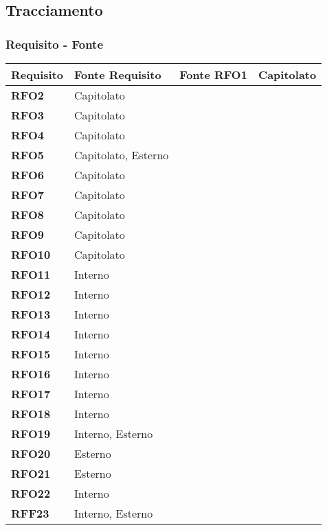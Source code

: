 \pagebreak
\subsection{Tracciamento}
\subsubsection{Requisito - Fonte}
\begin{longtable}{|>{\centering\arraybackslash}m{}|>{\centering\arraybackslash}m{}|}
	\hline
	\textbf{Requisito} & \textbf{Fonte} 
	\endfirsthead
	\hline
	\textbf{Requisito} & \textbf{Fonte} 
	\endhead
	\hline
	\textbf{RFO1}            & Capitolato\\\hline
	\textbf{RFO2}            & Capitolato\\\hline
	\textbf{RFO3}            & Capitolato\\\hline
	\textbf{RFO4}            & Capitolato\\\hline
	\textbf{RFO5}            & Capitolato, Esterno\\\hline
	\textbf{RFO6}            & Capitolato\\\hline
	\textbf{RFO7}            & Capitolato\\\hline
	\textbf{RFO8}            & Capitolato\\\hline
	\textbf{RFO9}            & Capitolato\\\hline
	\textbf{RFO10}            & Capitolato\\\hline
	\textbf{RFO11}            & Interno\\\hline
	\textbf{RFO12}            & Interno\\\hline
	\textbf{RFO13}            & Interno\\\hline
	\textbf{RFO14}            & Interno\\\hline
	\textbf{RFO15}            & Interno\\\hline
	\textbf{RFO16}            & Interno\\\hline
	\textbf{RFO17}            & Interno\\\hline
	\textbf{RFO18}            & Interno\\\hline
	\textbf{RFO19}            & Interno, Esterno\\\hline
	\textbf{RFO20}            & Esterno\\\hline
	\textbf{RFO21}            & Esterno\\\hline
	\textbf{RFO22}            & Interno\\\hline
	\textbf{RFF23}            & Interno, Esterno\\\hline

\end{longtable}
